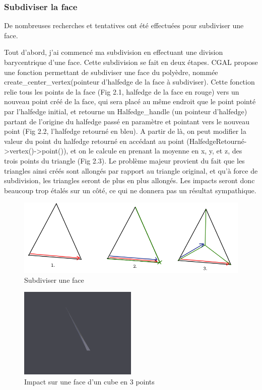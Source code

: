 \documentclass[a4paper,french]{report}
\begin{document}
				\subsubsection{Subdiviser la face}
					De nombreuses recherches et tentatives ont été effectuées pour subdiviser une face. \par
					Tout d'abord, j'ai commencé ma subdivision en effectuant une division barycentrique d'une face. Cette subdivision se fait en deux étapes. CGAL propose une fonction permettant de subdiviser une face du polyèdre, nommée create\_center\_vertex(pointeur d'halfedge de la face à subdiviser). Cette fonction relie tous les points de la face (Fig 2.1, halfedge de la face en rouge) vers un nouveau point créé de la face, qui sera placé au même endroit que le point pointé par l'halfedge initial, et retourne un Halfedge\_handle (un pointeur d'halfedge) partant de l'origine du halfedge passé en paramètre et pointant vers le nouveau point (Fig 2.2, l'halfedge retourné en bleu). A partir de là, on peut modifier la valeur du point du halfedge retourné en accédant au point (HalfedgeRetourné-\textgreater vertex()-\textgreater point()), et on le calcule en prenant la moyenne en x, y, et z, des trois points du triangle (Fig 2.3). Le problème majeur provient du fait que les triangles ainsi créés sont allongés par rapport au triangle original, et qu'à force de subdivision, les triangles seront de plus en plus allongés. Les impacts seront donc beaucoup trop étalés sur un côté, ce qui ne donnera pas un résultat sympathique. \par 
					\begin{figure}[h]
						\centering
						\includegraphics[width=1\textwidth]{FigBarycentricMesh.png}
						\caption{Subdiviser une face}
					\end{figure}
					\begin{figure}[h]
						\centering
						\includegraphics[width=0.5\textwidth]{impact1.png}
						\caption{Impact sur une face d'un cube en 3 points}
					\end{figure}
\end{document}
